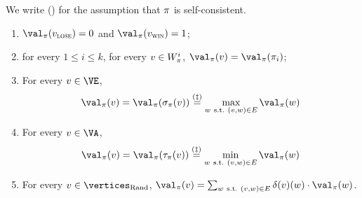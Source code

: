 \begin{lemma}
  \label{stoch:lemma2}
  We write (\ddag) for the assumption that $\pi$ is self-consistent.
  \begin{enumerate}
  \item $\val_\perm(\vlose) = 0$ and $\val_\perm(\vwin) = 1$;
  \item for every $1 \le i \le k$, for every $v \in W_\pi^i$,
    $\val_\perm(v) = \val_\perm(\perm_i)$;
  \item For every $v \in \Evevertices$,
    \[
    \val_\perm(v) = \val_\perm(\sigma_\perm(v)) \stackrel{(\ddag)}{=}
    \max_{w\ \text{s.t.}\ (v,w) \in E} \val_\perm(w)
    \]
  \item For every $v \in \Adamvertices$,
    \[
    \val_\perm(v) = \val_\perm(\tau_\perm(v)) \stackrel{(\ddag)}{=}
    \min_{w\ \text{s.t.}\ (v,w) \in E} \val_\perm(w)
    \]
  \item For every $v \in \Randomvertices$, $\val_\perm(v) = \sum_{w\
      \text{s.t.}\ (v,w) \in E} \delta(v)(w) \cdot \val_\perm(w)$.
  \end{enumerate}
\end{lemma}

